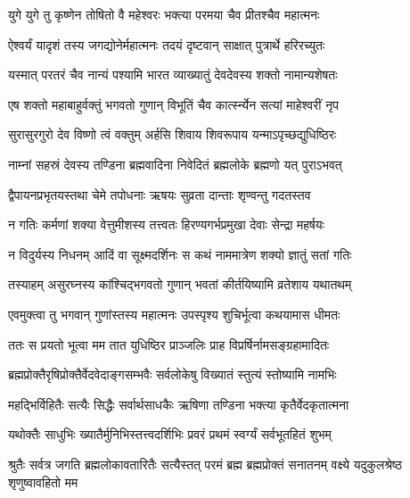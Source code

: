 \twolineshloka
{युगे युगे तु कृष्णेन तोषितो वै महेश्वरः}%
{भक्त्या परमया चैव प्रीतश्चैव महात्मनः}%

\twolineshloka
{ऐश्वर्यं यादृशं तस्य जगद्योनेर्महात्मनः}%
{तदयं दृष्टवान् साक्षात् पुत्रार्थे हरिरच्युतः}%

\twolineshloka
{यस्मात् परतरं चैव नान्यं पश्यामि भारत}%
{व्याख्यातुं देवदेवस्य शक्तो नामान्यशेषतः}%

\twolineshloka
{एष शक्तो महाबाहुर्वक्तुं भगवतो गुणान्}%
{विभूतिं चैव कार्त्स्न्येन सत्यां माहेश्वरीं नृप}%

\twolineshloka
{सुरासुरगुरो देव विष्णो त्वं वक्तुम् अर्हसि}%
{शिवाय शिवरूपाय यन्माऽपृच्छद्युधिष्ठिरः}%

\twolineshloka
{नाम्नां सहस्रं देवस्य तण्डिना ब्रह्मवादिना}%
{निवेदितं ब्रह्मलोके ब्रह्मणो यत् पुराऽभवत्}%

\twolineshloka
{द्वैपायनप्रभृतयस्तथा चेमे तपोधनाः}%
{ऋषयः सुव्रता दान्ताः शृण्वन्तु गदतस्तव}%


\twolineshloka
{न गतिः कर्मणां शक्या वेत्तुमीशस्य तत्त्वतः}%
{हिरण्यगर्भप्रमुखा देवाः सेन्द्रा महर्षयः}%

\twolineshloka
{न विदुर्यस्य निधनम् आदिं वा सूक्ष्मदर्शिनः}%
{स कथं नाममात्रेण शक्यो ज्ञातुं सतां गतिः}%

\twolineshloka
{तस्याहम् असुरघ्नस्य कांश्चिद्भगवतो गुणान्}%
{भवतां कीर्तयिष्यामि व्रतेशाय यथातथम्}%

\twolineshloka
{एवमुक्त्वा तु भगवान् गुणांस्तस्य महात्मनः}%
{उपस्पृश्य शुचिर्भूत्वा कथयामास धीमतः}%

\twolineshloka
{ततः स प्रयतो भूत्वा मम तात युधिष्ठिर}%
{प्राञ्जलिः प्राह विप्रर्षिर्नामसङ्ग्रहामादितः}%


\twolineshloka
{ब्रह्मप्रोक्तैरृषिप्रोक्तैर्वेदवेदाङ्गसम्भवैः}%
{सर्वलोकेषु विख्यातं स्तुत्यं स्तोष्यामि नामभिः}%

\twolineshloka
{महद्भिर्विहितैः सत्यैः सिद्धैः सर्वार्थसाधकैः}%
{ऋषिणा तण्डिना भक्त्या कृतैर्वेदकृतात्मना}%

\twolineshloka
{यथोक्तैः साधुभिः ख्यातैर्मुनिभिस्तत्त्वदर्शिभिः}%
{प्रवरं प्रथमं स्वर्ग्यं सर्वभूतहितं शुभम्}%

\threelineshloka
{श्रुतैः सर्वत्र जगति ब्रह्मलोकावतारितैः}
{सत्यैस्तत् परमं ब्रह्म ब्रह्मप्रोक्तं सनातनम्}%
{वक्ष्ये यदुकुलश्रेष्ठ शृणुष्वावहितो मम}%

